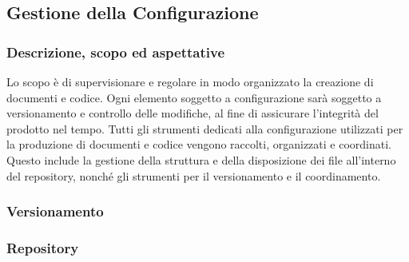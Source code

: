 \subsection{Gestione della Configurazione}

\subsubsection{Descrizione, scopo ed aspettative}
    Lo scopo è di supervisionare e regolare in modo organizzato la creazione di 
    documenti e codice. Ogni elemento soggetto a configurazione sarà soggetto a versionamento
    e controllo delle modifiche, al fine di assicurare l'integrità del prodotto 
    nel tempo.
    Tutti gli strumenti dedicati alla configurazione utilizzati per la produzione
    di documenti e codice vengono raccolti, organizzati e coordinati. Questo include
    la gestione della struttura e della disposizione dei file all'interno del repository, 
    nonché gli strumenti per il versionamento e il coordinamento.

\subsubsection{Versionamento}

\subsubsection{Repository}


